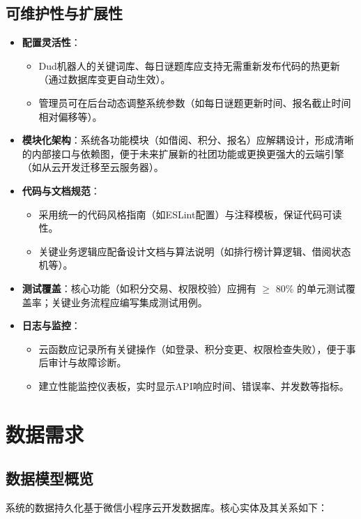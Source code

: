 \documentclass[a4paper,12pt]{article}
\begin{document}
\subsection{可维护性与扩展性}
\begin{itemize}
    \item \textbf{配置灵活性}：
        \begin{itemize}
            \item Dud机器人的关键词库、每日谜题库应支持无需重新发布代码的热更新（通过数据库变更自动生效）。
            \item 管理员可在后台动态调整系统参数（如每日谜题更新时间、报名截止时间相对偏移等）。
        \end{itemize}
    \item \textbf{模块化架构}：系统各功能模块（如借阅、积分、报名）应解耦设计，形成清晰的内部接口与依赖图，便于未来扩展新的社团功能或更换更强大的云端引擎（如从云开发迁移至云服务器）。
    \item \textbf{代码与文档规范}：
        \begin{itemize}
            \item 采用统一的代码风格指南（如ESLint配置）与注释模板，保证代码可读性。
            \item 关键业务逻辑应配备设计文档与算法说明（如排行榜计算逻辑、借阅状态机等）。
        \end{itemize}
    \item \textbf{测试覆盖}：核心功能（如积分交易、权限校验）应拥有 $\geq$ 80\% 的单元测试覆盖率；关键业务流程应编写集成测试用例。
    \item \textbf{日志与监控}：
        \begin{itemize}
            \item 云函数应记录所有关键操作（如登录、积分变更、权限检查失败），便于事后审计与故障诊断。
            \item 建立性能监控仪表板，实时显示API响应时间、错误率、并发数等指标。
        \end{itemize}
\end{itemize}

\section{数据需求}

\subsection{数据模型概览}
系统的数据持久化基于微信小程序云开发数据库。核心实体及其关系如下：
\end{document}
